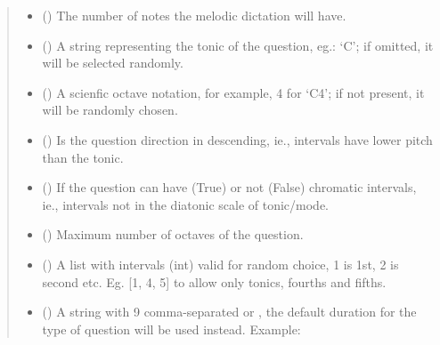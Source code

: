 \documentclass[letterpaper,10pt,english]{sphinxmanual}
\begin{document}
\begin{fulllineitems}
\begin{fulllineitems}
\begin{quote}
\begin{description}
\begin{itemize}
\item {} 
 () \textendash{} The number of notes the melodic dictation will have.

\item {} 
 () \textendash{} A string representing the tonic of the question,
eg.: ‘C’; if omitted, it will be selected randomly.

\item {} 
 () \textendash{} A scienfic octave notation, for example, 4 for ‘C4’;
if not present, it will be randomly chosen.

\item {} 
 () \textendash{} Is the question direction in descending, ie.,
intervals have lower pitch than the tonic.

\item {} 
 () \textendash{} If the question can have (True) or not (False)
chromatic intervals, ie., intervals not in the diatonic scale
of tonic/mode.

\item {} 
 () \textendash{} Maximum number of octaves of the question.

\item {} 
 () \textendash{} A list with intervals (int) valid for
random choice, 1 is 1st, 2 is second etc. Eg. {[}1, 4, 5{]} to
allow only tonics, fourths and fifths.

\item {} 
 () \textendash{} 
A string with 9 comma-separated  or
, the
default duration for the type of question will be used instead.
Example:


\end{itemize}
\end{description}
\end{quote}
\end{fulllineitems}
\end{fulllineitems}
\end{document}
